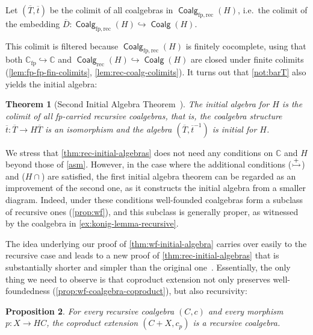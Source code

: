 \documentclass[10pt,a4paper]{article}
\newtheorem{theorem}{Theorem}[section]
\newtheorem{proposition}[theorem]{Proposition}
\theoremstyle{definition}
\theoremstyle{remark}
\numberwithin{equation}{section}
\newcommand{\ol}{\overline}
\providecommand{\C}{}
\newcommand{\fp}{{\mathrm{fp}}}
\newcommand{\rec}{{\mathrm{rec}}}
\newcommand{\frc}{\Coalg_{\fp,\rec}(H)}
\renewcommand{\C}{{\mathbb{C}}}
\DeclareMathOperator{\Coalg}{\mathsf{Coalg}}
\newcommand{\subto}{\hookrightarrow}
\newcommand{\injmono}{\ensuremath{\overset{\smash{\raisebox{-1pt}{\ensuremath{\scriptstyle+}}}}{\rightarrowtail}}}\newcommand{\hpresint}{\ensuremath{H\cap}\xspace}
\theoremstyle{plain}
\theoremstyle{definition}
\begin{document}
\begin{construction}\label{not:barT}
Let $(\ol{T},\ol{t})$ be the colimit of all coalgebras in $\frc$, i.e.\ the colimit of the embedding $\ol{D}\colon \frc\subto \Coalg(H)$. 
\end{construction}
This colimit is filtered because $\Coalg_{\fp,\rec}(H)$ is finitely cocomplete, using that both $\C_\fp\subto \C$ and $\Coalg_\rec(H)\subto \Coalg(H)$ are closed under finite colimits (\autoref{lem:fp-fp-fin-colimits}, \autoref{lem:rec-coalg-colimits}). It turns out that \autoref{not:barT} also yields the initial algebra:

\begin{theorem}[Second Initial Algebra Theorem~\cite{wm24}]\label{thm:rec-initial-algebras}
The initial algebra for $H$ is the colimit of all fp-carried recursive coalgebras, that is, the coalgebra structure $\ol{t}\colon \ol{T}\to H\ol{T}$ is an isomorphism and the algebra $(\ol{T},\ol{t}^{-1})$ is initial for $H$.
\end{theorem}
We stress that \autoref{thm:rec-initial-algebras} does not need any conditions on $\C$ and $H$ beyond those of \autoref{asm}. However, in the case where the additional conditions (\injmono) and (\hpresint) are satisfied, the first initial algebra theorem can be regarded as an improvement of the second one, as it constructs the initial algebra from a smaller diagram. Indeed, under these conditions well-founded coalgebras form a subclass of recursive ones (\autoref{prop:wf}), and this subclass is generally proper, as witnessed by the coalgebra in \autoref{ex:konig-lemma-recursive}.

The idea underlying our proof of \autoref{thm:wf-initial-algebra} carries over easily to the recursive case and leads to a new proof of \autoref{thm:rec-initial-algebras} that is substantially shorter and simpler than the original one~\cite{wm24}. Essentially, the only thing we need to observe is that coproduct extension not only preserves well-foundedness (\autoref{prop:wf-coalgebra-coproduct}), but also recursivity:

\begin{proposition}\label{prop:rec-coalgebra-coproduct}
For every recursive coalgebra $(C,c)$ and every morphism $p\colon X\to HC$, the coproduct extension $(C+X,c_p)$ is a recursive coalgebra.
\end{proposition}
\end{document}
